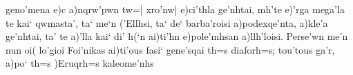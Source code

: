 \documentclass[12pt]{article}
\begin{document}
\begin{otherlanguage}{ibycus}
  geno'mena e)c a)nqrw'pwn tw=| xro'nw| e)ci'thla ge'nhtai, mh'te
  e)'rga mega'la te kai` qwmasta', ta` me`n ('Ellhsi, ta` de`
  barba'roisi a)podexqe'nta, a)kle'a ge'nhtai, ta' te a)'lla kai` di'
  h(`n ai)ti'hn e)pole'mhsan a)llh'loisi.
  Perse'wn me'n nun oi( lo'gioi Foi'nikas ai)ti'ous fasi` gene'sqai
  th=s diaforh=s; tou'tous ga'r, a)po` th=s )Eruqrh=s kaleome'nhs
\end{otherlanguage}
\end{document}
